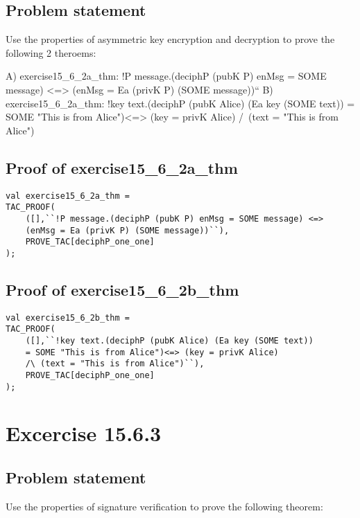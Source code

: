 \documentclass{report}
\begin{document}
\section{Problem statement}
\label{problem-statement-15-6-2}
Use the properties of asymmetric key encryption and decryption
to prove the following 2 theroems:

A) exercise15_6_2a_thm:
!P message.(deciphP (pubK P) enMsg = SOME message) <=>
    (enMsg = Ea (privK P) (SOME message))``
B) exercise15_6_2a_thm:
!key text.(deciphP (pubK Alice) (Ea key (SOME text)) 
    = SOME "This is from Alice")<=> (key = privK Alice) 
    /\ (text = "This is from Alice")

\section{Proof of exercise15_6_2a_thm}
\label{proof-15-6-2-A}
\begin{lstlisting}[frame=TBlr]
val exercise15_6_2a_thm =
TAC_PROOF(
    ([],``!P message.(deciphP (pubK P) enMsg = SOME message) <=>
    (enMsg = Ea (privK P) (SOME message))``),
    PROVE_TAC[deciphP_one_one]
);
\end{lstlisting}



\section{Proof of exercise15_6_2b_thm}
\label{proof-15-6-2-B}
\begin{lstlisting}[frame=TBlr]
val exercise15_6_2b_thm =
TAC_PROOF(
    ([],``!key text.(deciphP (pubK Alice) (Ea key (SOME text)) 
    = SOME "This is from Alice")<=> (key = privK Alice) 
    /\ (text = "This is from Alice")``),
    PROVE_TAC[deciphP_one_one]
);
\end{lstlisting}



\chapter{Excercise 15.6.3}
\label{cha:15-6-3}

\section{Problem statement}
\label{problem-statement-15-6-3}
Use the properties of signature verification to prove the following theorem:
\end{document}
